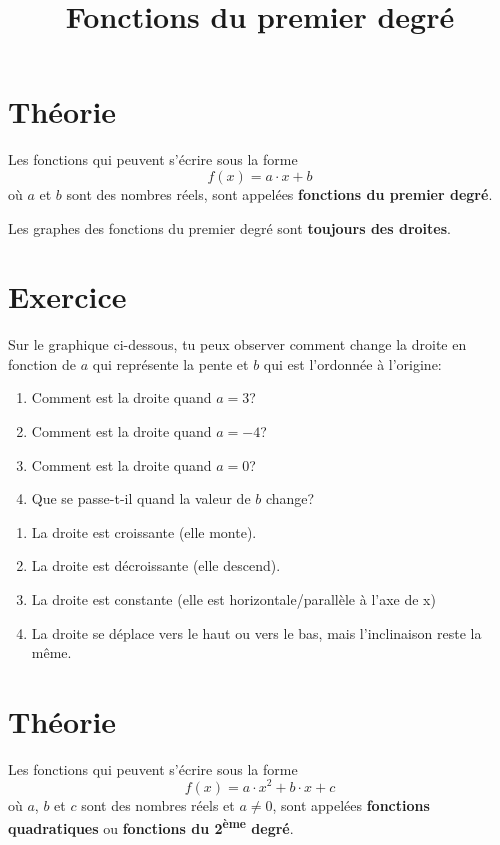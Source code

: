 \documentclass[a4paper,11pt]{article}
\begin{document}
\title{Fonctions du premier degré}
\date{}
\maketitle

\section{Théorie}
Les fonctions qui peuvent s'écrire sous la forme
$$f(x)=a\cdot x +b$$
où $a$ et $b$ sont des nombres réels, sont appelées \textbf{fonctions du premier degré}.

Les graphes des fonctions du premier degré sont \textbf{toujours des droites}.

\section{Exercice}
Sur le graphique ci-dessous, tu peux observer comment change la droite en fonction de $a$ qui représente la pente et $b$ qui est l'ordonnée à l'origine:\par
{}
\begin{enumerate}
    \item Comment est la droite quand $a = 3$?
    \item Comment est la droite quand $a = -4$?
    \item Comment est la droite quand $a = 0$?
    \item Que se passe-t-il quand la valeur de $b$ change?
\end{enumerate}

\begin{solution}
\begin{enumerate}
    \item La droite est croissante (elle monte).
    \item La droite est décroissante (elle descend).
    \item La droite est constante (elle est horizontale/parallèle à l'axe de x)
    \item La droite se déplace vers le haut ou vers le bas, mais l'inclinaison reste la même.
\end{enumerate}
\end{solution}

\section{Théorie}
Les fonctions qui peuvent s'écrire sous la forme
$$f(x)=a\cdot x^2 + b \cdot x + c$$
où $a$, $b$ et $c$ sont des nombres réels et $a \ne 0$, sont appelées \textbf{fonctions quadratiques} ou \textbf{fonctions du 2\textsuperscript{ème} degré}.
\end{document}
